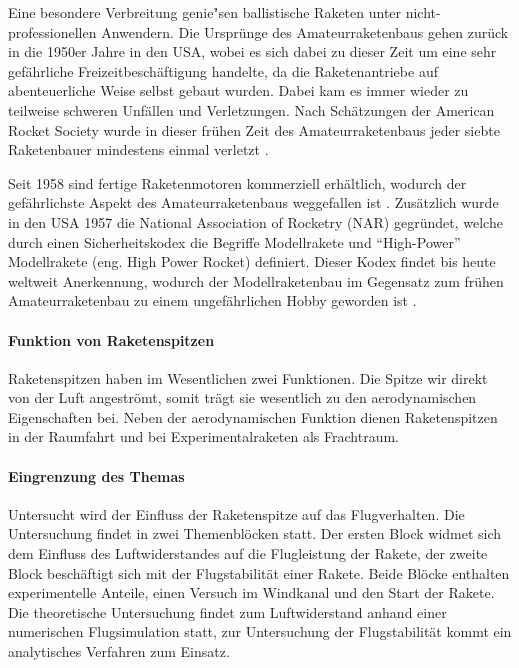 \documentclass[10pt,a4paper]{article}
\begin{document}
Eine besondere Verbreitung genie"sen ballistische Raketen unter nicht-professionellen Anwendern. Die Ursprünge des Amateurraketenbaus gehen zurück in die 1950er Jahre in den USA, wobei es sich dabei zu dieser Zeit um eine sehr gefährliche Freizeitbeschäftigung handelte, da die Raketenantriebe auf abenteuerliche Weise selbst gebaut wurden. Dabei kam es immer wieder zu teilweise schweren Unfällen und Verletzungen. Nach Schätzungen der American Rocket Society wurde in dieser frühen Zeit des Amateurraketenbaus jeder siebte Raketenbauer mindestens einmal verletzt \cite{om,sn}.

Seit 1958 sind fertige Raketenmotoren kommerziell erhältlich, wodurch der gefährlichste Aspekt des Amateurraketenbaus weggefallen ist \cite{sn}. Zusätzlich wurde in den USA 1957 die National Association of Rocketry (NAR) gegründet, welche durch einen Sicherheitskodex die Begriffe Modellrakete und "`High-Power"' Modellrakete (eng. High Power Rocket) definiert. Dieser Kodex findet bis heute weltweit Anerkennung, wodurch der Modellraketenbau im Gegensatz zum frühen Amateurraketenbau zu einem ungefährlichen Hobby geworden ist \cite{om}.

\paragraph{Funktion von Raketenspitzen}
Raketenspitzen haben im Wesentlichen zwei Funktionen. Die Spitze wir direkt von der Luft angeströmt, somit trägt sie wesentlich zu den aerodynamischen Eigenschaften bei. Neben der aerodynamischen Funktion dienen Raketenspitzen in der Raumfahrt und bei Experimentalraketen als Frachtraum.


\paragraph{Eingrenzung des Themas}
Untersucht wird der Einfluss der Raketenspitze auf das Flugverhalten. Die Untersuchung findet in zwei Themenblöcken statt. Der ersten Block widmet sich dem Einfluss des Luftwiderstandes auf die Flugleistung der Rakete, der zweite Block beschäftigt sich mit der Flugstabilität einer Rakete. Beide Blöcke enthalten experimentelle Anteile, einen Versuch im Windkanal und den Start der Rakete. Die theoretische Untersuchung findet zum Luftwiderstand anhand einer numerischen Flugsimulation statt, zur Untersuchung der Flugstabilität kommt ein analytisches Verfahren zum Einsatz.
\end{document}
